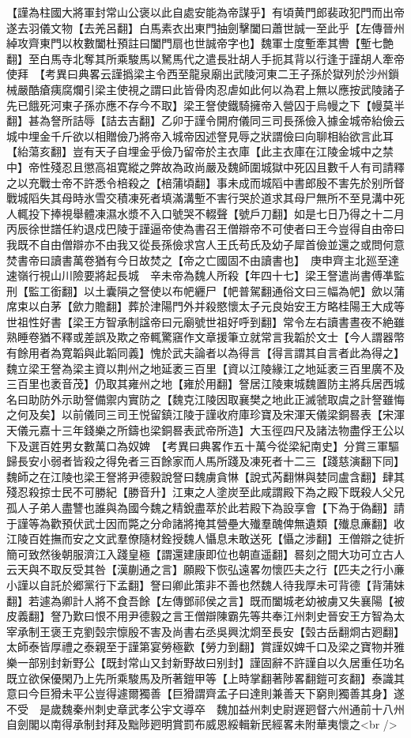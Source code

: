 【謹為柱國大將軍封常山公褒以此自處安能為帝謀乎】有頃黄門郎裴政犯門而出帝遂去羽儀文物【去羌呂翻】白馬素衣出東門抽劍擊闔曰蕭世誠一至此乎【左傳晉州綽攻齊東門以枚數闔杜預註曰闔門扇也世誠帝字也】魏軍士度塹牽其轡【塹七艶翻】至白馬寺北奪其所乘駿馬以駑馬代之遣長壯胡人手扼其背以行逢于謹胡人牽帝使拜　【考異曰典畧云謹撝梁主令西至龍泉廟出武陵河東二王子孫於獄列於沙州鎻械嚴酷瘡痍腐爛引梁主使視之謂曰此皆骨肉忍虐如此何以為君上無以應按武陵諸子先已餓死河東子孫亦應不存今不取】梁王詧使鐵騎擁帝入營囚于烏幔之下【幔莫半翻】甚為詧所詰辱【詰去吉翻】乙卯于謹令開府儀同三司長孫儉入據金城帝紿儉云城中埋金千斤欲以相贈儉乃將帝入城帝因述詧見辱之狀謂儉曰向聊相紿欲言此耳【紿蕩亥翻】豈有天子自埋金乎儉乃留帝於主衣庫【此主衣庫在江陵金城中之禁中】帝性殘忍且懲高祖寛縱之弊故為政尚嚴及魏師圍城獄中死囚且數千人有司請釋之以充戰士帝不許悉令棓殺之【棓蒲頃翻】事未成而城䧟中書郎殷不害先於别所督戰城䧟失其母時氷雪交積凍死者填滿溝塹不害行哭於道求其母尸無所不至見溝中死人輒投下捧視舉體凍濕水漿不入口號哭不輟聲【號戶刀翻】如是七日乃得之十二月丙辰徐世譜任約退戍巴陵于謹逼帝使為書召王僧辯帝不可使者曰王今豈得自由帝曰我既不自由僧辯亦不由我又從長孫儉求宫人王氏苟氏及幼子犀首儉並還之或問何意焚書帝曰讀書萬卷猶有今日故焚之【帝之亡國固不由讀書也】　庚申齊主北廵至達速嶺行視山川險要將起長城　辛未帝為魏人所殺【年四十七】梁王詧遣尚書傅凖監刑【監工銜翻】以土囊隕之詧使以布帊纒尸【帊普駕翻通俗文曰三幅為帊】歛以蒲席束以白茅【歛力贍翻】葬於津陽門外并殺愍懷太子元良始安王方略桂陽王大成等世祖性好書【梁王方智承制諡帝曰元廟號世祖好呼到翻】常令左右讀書晝夜不絶雖熟睡卷猶不釋或差誤及欺之帝輒驚窹作文章援筆立就常言我韜於文士【今人謂器幣有餘用者為寛韜與此韜同義】愧於武夫論者以為得言【得言謂其自言者此為得之】魏立梁王詧為梁主資以荆州之地延袤三百里【資以江陵緣江之地延袤三百里廣不及三百里也袤音茂】仍取其雍州之地【雍於用翻】詧居江陵東城魏置防主將兵居西城名曰助防外示助詧備禦内實防之【魏克江陵因取襄樊之地此正滅虢取虞之計詧雖悔之何及矣】以前儀同三司王悦留鎮江陵于謹收府庫珍寶及宋渾天儀梁銅晷表【宋渾天儀元嘉十三年錢樂之所鑄也梁銅晷表武帝所造】大玉徑四尺及諸法物盡俘王公以下及選百姓男女數萬口為奴婢　【考異曰典畧作五十萬今從梁紀南史】分賞三軍驅歸長安小弱者皆殺之得免者三百餘家而人馬所踐及凍死者十二三【踐慈演翻下同】魏師之在江陵也梁王詧將尹德毅說詧曰魏虜貪惏【說式芮翻惏與婪同盧含翻】肆其殘忍殺掠士民不可勝紀【勝音升】江東之人塗炭至此咸謂殿下為之殿下既殺人父兄孤人子弟人盡讐也誰與為國今魏之精銳盡萃於此若殿下為設享會【下為于偽翻】請于謹等為歡預伏武士因而斃之分命諸將掩其營壘大殱羣醜俾無遺類【殱息亷翻】收江陵百姓撫而安之文武羣僚隨材銓授魏人懾息未敢送死【懾之涉翻】王僧辯之徒折簡可致然後朝服濟江入踐皇極【謂還建康即位也朝直遥翻】晷刻之間大功可立古人云天與不取反受其咎【漢蒯通之言】願殿下恢弘遠畧勿懷匹夫之行【匹夫之行小亷小謹以自託於郷黨行下孟翻】詧曰卿此策非不善也然魏人待我厚未可背德【背蒲妹翻】若遽為卿計人將不食吾餘【左傳鄧祁侯之言】既而闔城老幼被虜又失襄陽【被皮義翻】詧乃歎曰恨不用尹德毅之言王僧辯陳霸先等共奉江州刺史晉安王方智為太宰承制王褒王克劉㲄宗懔殷不害及尚書右丞吳興沈烱至長安【㲄古岳翻烱古㢠翻】太師泰皆厚禮之泰親至于謹第宴勞極歡【勞力到翻】賞謹奴婢千口及梁之寶物并雅樂一部别封新野公【既封常山又封新野故曰别封】謹固辭不許謹自以久居重任功名既立欲保優閑乃上先所乘駿馬及所著鎧甲等【上時掌翻著陟畧翻鎧可亥翻】泰識其意曰今巨猾未平公豈得遽爾獨善【巨猾謂齊孟子曰達則兼善天下窮則獨善其身】遂不受　是歲魏秦州刺史章武孝公宇文導卒　魏加益州刺史尉遟㢠督六州通前十八州自劍閣以南得承制封拜及黜陟㢠明賞罰布威恩綏輯新民經畧未附華夷懷之<br />
